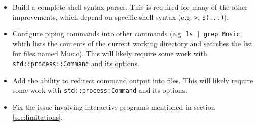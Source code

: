 \documentclass[12pt,twoside]{report} %
\begin{document}
	\begin{itemize}[noitemsep,topsep=0pt]
	    \item Build a complete shell syntax parser. This is required for many of the other improvements, which depend on specific shell syntax (e.g. \verb|>|, \verb|$(...)|).
	    \item Configure piping commands into other commands (e.g. \verb`ls | grep Music`, which lists the contents of the current working directory and searches the list for files named Music). This will likely require some work with \verb|std::process::Command| and its options.
	    \item Add the ability to redirect command output into files. This will likely require some work with \verb|std::process:Command| and its options.
	    \item Fix the issue involving interactive programs mentioned in section \ref{sec:limitations}.
	\end{itemize}

	\appendix



	

	
\end{document}
